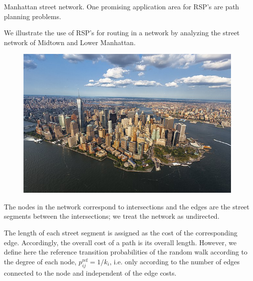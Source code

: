 \documentclass[13pt]{beamer}
\begin{document}
    \begin{frame}[t,allowframebreaks]{Manhattan street network.}
    One promising application area for RSP’s are path planning problems.

    \vspace{0.8em}

    We illustrate the use of RSP’s for routing in a network by analyzing the street network of Midtown and Lower Manhattan.

    \begin{center}
    \begin{figure}
    \includegraphics[height=0.4\paperheight]{Images/man.jpg}
    \end{figure}
    \end{center}

    \newpage

    The nodes in the network correspond to intersections and the edges are the street segments between the intersections; we treat the network as undirected. 

    \vspace{0.8em}

    The length of each street segment is assigned as the cost of the corresponding edge. Accordingly, the overall
    cost of a path is its overall length. However, we define here the reference transition probabilities of the random
    walk according to the degree of each node, $p_{ij}^\text{ref}=1/k_i$, i.e. only according to the number of edges connected to the node and independent of the edge costs.

    \newpage


\end{frame}
\end{document}
